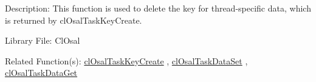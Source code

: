 \begin{Desc}
\item[Description:]This function is used to delete the key for thread-specific data, which is returned by cl\-Osal\-Task\-Key\-Create.\end{Desc}
\begin{Desc}
\item[Library File:]Cl\-Osal\end{Desc}
\begin{Desc}
\item[Related Function(s):]\hyperlink{pageosal123}{cl\-Osal\-Task\-Key\-Create} , \hyperlink{pageosal125}{cl\-Osal\-Task\-Data\-Set} , 
\hyperlink{pageosal126}{cl\-Osal\-Task\-Data\-Get} \end{Desc}

\newpage

